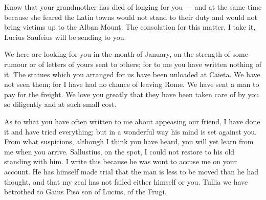 

 Know that your grandmother has died of longing for you --- and at the same time because she feared the Latin towns would not stand to their duty and would not bring victims up to the Alban Mount. The consolation for this matter, I take it, Lucius Saufeius will be sending to you.

 We here are looking for you in the month of January, on the strength of some rumour or of letters of yours sent to others; for to me you have written nothing of it. The statues which you arranged for us have been unloaded at Caieta. We have not seen them; for I have had no chance of leaving Rome. We have sent a man to pay for the freight. We love you greatly that they have been taken care of by you so diligently and at such small cost.

 As to what you have often written to me about appeasing our friend, I have done it and have tried everything; but in a wonderful way his mind is set against you. From what suspicions, although I think you have heard, you will yet learn from me when you arrive. Sallustius, on the spot, I could not restore to his old standing with him. I write this because he was wont to accuse me on your account. He has himself made trial that the man is less to be moved than he had thought, and that my zeal has not failed either himself or you. Tullia we have betrothed to Gaius Piso son of Lucius, of the Frugi.

